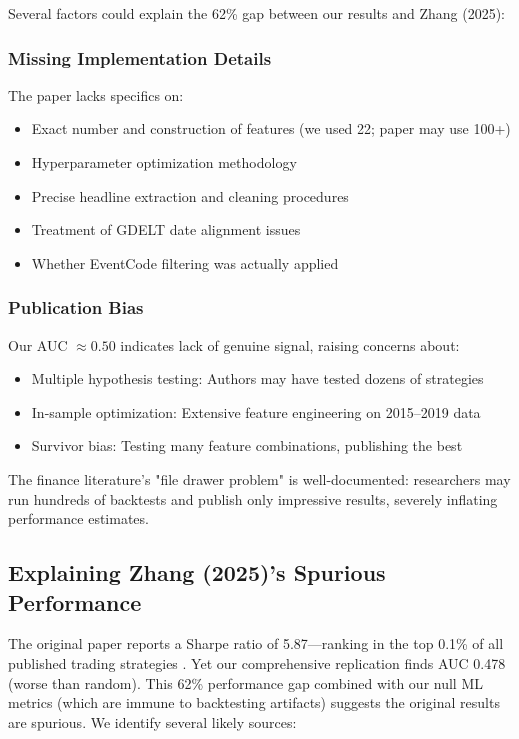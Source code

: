 \documentclass[11pt]{article}
\begin{document}
Several factors could explain the 62\% gap between our results and Zhang (2025):

\subsubsection{Missing Implementation Details}

The paper lacks specifics on:
\begin{itemize}
    \item Exact number and construction of features (we used 22; paper may use 100+)
    \item Hyperparameter optimization methodology
    \item Precise headline extraction and cleaning procedures
    \item Treatment of GDELT date alignment issues
    \item Whether EventCode filtering was actually applied
\end{itemize}

\subsubsection{Publication Bias}

Our AUC $\approx 0.50$ indicates lack of genuine signal, raising concerns about:
\begin{itemize}
    \item Multiple hypothesis testing: Authors may have tested dozens of strategies
    \item In-sample optimization: Extensive feature engineering on 2015--2019 data
    \item Survivor bias: Testing many feature combinations, publishing the best
\end{itemize}

The finance literature's "file drawer problem" \citep{harvey2016backtests} is well-documented: researchers may run hundreds of backtests and publish only impressive results, severely inflating performance estimates.

\subsection{Explaining Zhang (2025)'s Spurious Performance}

The original paper reports a Sharpe ratio of 5.87---ranking in the top 0.1\% of all published trading strategies \citep{harvey2016backtests}. Yet our comprehensive replication finds AUC 0.478 (worse than random). This 62\% performance gap combined with our null ML metrics (which are immune to backtesting artifacts) suggests the original results are spurious. We identify several likely sources:
\end{document}
